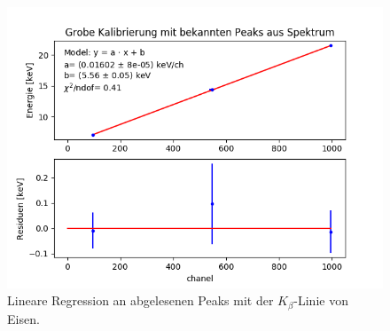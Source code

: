 \documentclass[12pt,a4paper]{article}
\begin{document}
\begin{figure} [H]
\centering
\includegraphics[scale=0.8]{Bilder/Quellspektrum/Kalibrierung_beta.png}
\caption{Lineare Regression an abgelesenen Peaks mit der $K_{\beta}$-Linie von Eisen.}
\end{figure}
\end{document}
